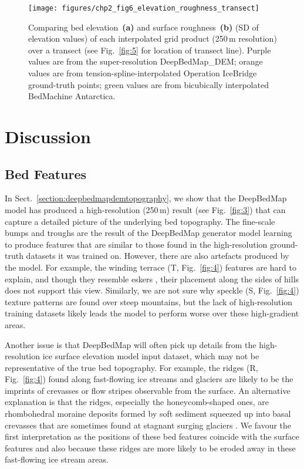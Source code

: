 \begin{figure}[t]
  \texttt{[image: figures/chp2\_fig6\_elevation\_roughness\_transect]}
  \caption[Transect plots of bed elevation and surface roughness of interpolated grid products]{
    Comparing bed elevation~\textbf{(a)} and surface roughness~\textbf{(b)} (SD of elevation values) of each interpolated grid product (250\,\unit{m} resolution) over a transect (see Fig.~\ref{fig:5} for location of transect line).
    Purple values are from the super-resolution DeepBedMap\_DEM;
    orange values are from tension-spline-interpolated Operation IceBridge ground-truth points;
    green values are from bicubically interpolated BedMachine Antarctica.
  }
  \label{fig:6}
\end{figure}


\section{Discussion}

\subsection{Bed Features}

In Sect.~\ref{section:deepbedmapdemtopography}, we show that the DeepBedMap model has produced a high-resolution (250\,\unit{m}) result (see Fig.~\ref{fig:3}) that can capture a detailed picture of the underlying bed topography.
The fine-scale bumps and troughs are the result of the DeepBedMap generator model learning to produce features that are similar to those found in the high-resolution ground-truth datasets it was trained on.
However, there are also artefacts produced by the model.
For example, the winding terrace (T, Fig.~\ref{fig:4}) features are hard to explain, and though they resemble eskers \citep{DrewsActivelyevolvingsubglacial2017}, their placement along the sides of hills does not support this view.
Similarly, we are not sure why speckle (S, Fig.~\ref{fig:4}) texture patterns are found over steep mountains, but the lack of high-resolution training datasets likely leads the model to perform worse over these high-gradient areas.

Another issue is that DeepBedMap will often pick up details from the high-resolution ice surface elevation model \citep{HowatReferenceElevationModel2019} input dataset, which may not be representative of the true bed topography.
For example, the ridges (R, Fig.~\ref{fig:4}) found along fast-flowing ice streams and glaciers are likely to be the imprints of crevasses or flow stripes \citep{GlasserLongitudinalsurfacestructures2012} observable from the surface.
An alternative explanation is that the ridges, especially the honeycomb-shaped ones, are rhombohedral moraine deposits formed by soft sediment squeezed up into basal crevasses that are sometimes found at stagnant surging glaciers \citep{Dowdeswellvarietydistributionsubmarine2016,DowdeswellRhombohedralcrevassefillridges2016,SolheimSeafloormorphologyoutside1985}.
We favour the first interpretation as the positions of these bed features coincide with the surface features and also because these ridges are more likely to be eroded away in these fast-flowing ice stream areas.

